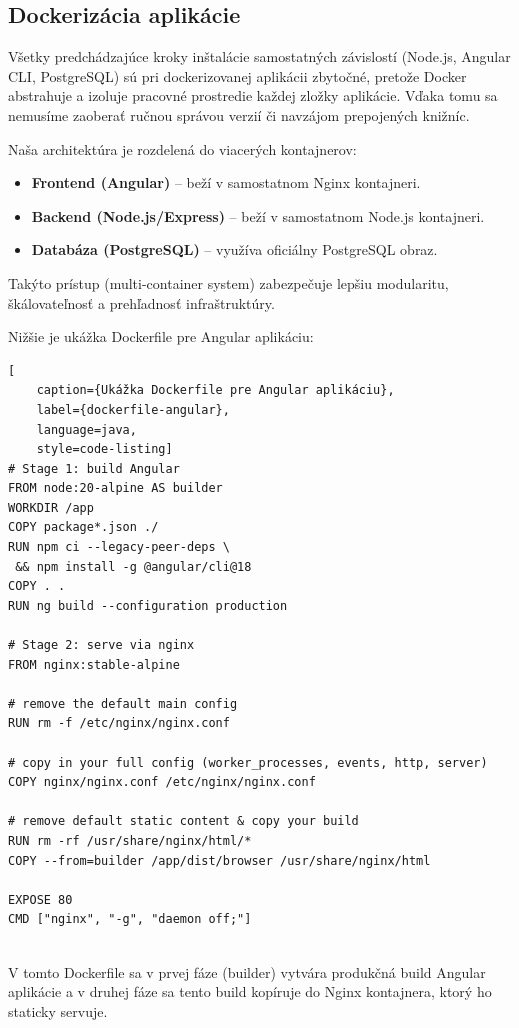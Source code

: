   \subsection{Dockerizácia aplikácie}

  Všetky predchádzajúce kroky inštalácie samostatných závislostí (Node.js, Angular CLI, PostgreSQL) sú pri dockerizovanej aplikácii zbytočné, pretože Docker abstrahuje a izoluje pracovné prostredie každej zložky aplikácie. Vďaka tomu sa nemusíme zaoberať ručnou správou verzií či navzájom prepojených knižníc.
  
  Naša architektúra je rozdelená do viacerých kontajnerov:
  \begin{itemize}
    \item \textbf{Frontend (Angular)} – beží v samostatnom Nginx kontajneri.
    \item \textbf{Backend (Node.js/Express)} – beží v samostatnom Node.js kontajneri.
    \item \textbf{Databáza (PostgreSQL)} – využíva oficiálny PostgreSQL obraz.
  \end{itemize}
  
  Takýto prístup (multi-container system) zabezpečuje lepšiu modularitu, škálovateľnosť a prehľadnosť infraštruktúry.
  
  Nižšie je ukážka Dockerfile pre Angular aplikáciu:
  
  \begin{lstlisting}[
    caption={Ukážka Dockerfile pre Angular aplikáciu},
    label={dockerfile-angular},
    language=java,
    style=code-listing]
# Stage 1: build Angular
FROM node:20-alpine AS builder
WORKDIR /app
COPY package*.json ./
RUN npm ci --legacy-peer-deps \
 && npm install -g @angular/cli@18
COPY . .
RUN ng build --configuration production

# Stage 2: serve via nginx
FROM nginx:stable-alpine

# remove the default main config
RUN rm -f /etc/nginx/nginx.conf

# copy in your full config (worker_processes, events, http, server)
COPY nginx/nginx.conf /etc/nginx/nginx.conf

# remove default static content & copy your build
RUN rm -rf /usr/share/nginx/html/*
COPY --from=builder /app/dist/browser /usr/share/nginx/html

EXPOSE 80
CMD ["nginx", "-g", "daemon off;"]


  \end{lstlisting}
  
  V tomto Dockerfile sa v prvej fáze (builder) vytvára produkčná build Angular aplikácie a v druhej fáze sa tento build kopíruje do Nginx kontajnera, ktorý ho staticky servuje.
  
